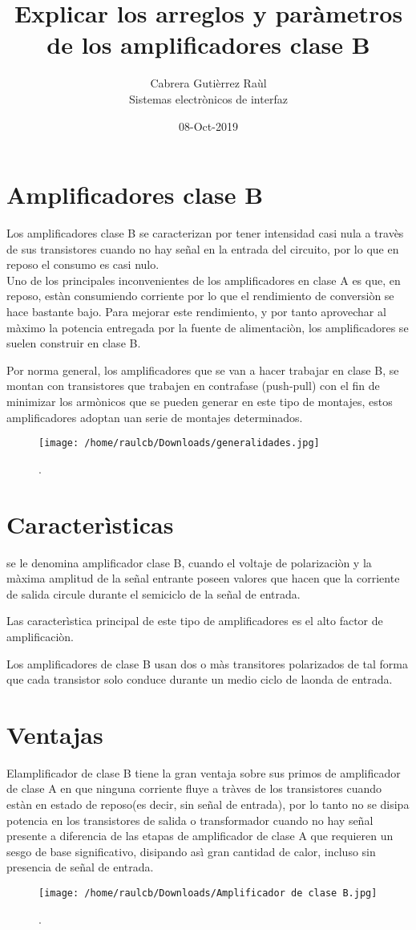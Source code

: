 \documentclass[11pt]{article}
\title{\textbf{Explicar los arreglos y paràmetros de los amplificadores clase B }}
\author{Cabrera Gutièrrez Raùl
\\
Sistemas electrònicos de interfaz}
\date{08-Oct-2019}
\begin{document}
\maketitle

\section{Amplificadores clase B}
Los amplificadores clase B se caracterizan por tener intensidad casi nula a travès de sus transistores cuando no hay señal en la entrada del circuito, por lo 	que en reposo el consumo es casi nulo.
\\

Uno de los principales inconvenientes de los amplificadores en clase A es que, en reposo, estàn consumiendo corriente por lo que el rendimiento de conversiòn se hace bastante bajo. Para mejorar este rendimiento, y por tanto aprovechar al màximo la potencia entregada por la fuente de alimentaciòn, los amplificadores se suelen construir en clase B.


Por norma general, los amplificadores que se van a hacer trabajar en clase B, se montan con transistores que trabajen en contrafase (push-pull) con el fin de minimizar los armònicos que se pueden generar en este tipo de montajes, estos amplificadores adoptan uan serie de montajes determinados.

\begin{figure}[htp]
\centering
\texttt{[image: /home/raulcb/Downloads/generalidades.jpg]}
\caption{.}
\label{.}
\end{figure}

\section{Caracterìsticas}
se le denomina amplificador clase B, cuando el voltaje de polarizaciòn y la màxima amplitud de la señal entrante poseen valores que hacen que la corriente de salida circule durante el semiciclo de la señal de entrada.


Las caracterìstica principal de este tipo de amplificadores es el alto factor de amplificaciòn.


Los amplificadores de clase B usan dos o màs transitores polarizados de tal forma que cada transistor solo conduce durante un medio ciclo de laonda de entrada.


\section{Ventajas}
Elamplificador de clase B tiene la gran ventaja sobre sus primos de amplificador de clase A en que ninguna corriente fluye a tràves de los transistores cuando estàn en estado de reposo(es decir, sin señal de entrada), por lo tanto no se disipa potencia en los transistores de salida o transformador cuando no hay señal presente a diferencia de las etapas de amplificador de clase A que requieren un sesgo de base significativo, disipando asì gran cantidad de calor, incluso sin presencia de señal de entrada.

\begin{figure}[htp]
\centering
\texttt{[image: /home/raulcb/Downloads/Amplificador de clase B.jpg]}
\caption{.}
\label{.}
\end{figure}
\end{document}

